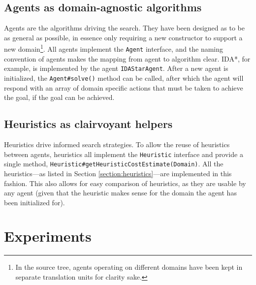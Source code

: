 \documentclass{article}
\begin{document}
\subsection{Agents as domain-agnostic algorithms}
Agents are the algorithms driving the search. They have been designed as to be as general as possible, in essence only requiring a new constructor to support a new domain\footnote{In the source tree, agents operating on different domains have been kept in separate translation units for clarity sake.}. All agents implement the \texttt{Agent} interface, and the naming convention of agents makes the mapping from agent to algorithm clear. IDA*, for example, is implemented by the agent \texttt{IDAStarAgent}. After a new agent is initialized, the \texttt{Agent\#solve()} method can be called, after which the agent will respond with an array of domain specific actions that must be taken to achieve the goal, if the goal can be achieved.

\subsection{Heuristics as clairvoyant helpers}
Heuristics drive informed search strategies. To allow the reuse of heuristics between agents, heuristics all implement the \texttt{Heuristic} interface and provide a single method, \texttt{Heuristic\#getHeuristicCostEstimate(Domain)}. All the heuristics---as listed in Section \ref{section:heuristics}---are implemented in this fashion. This also allows for easy comparison of heuristics, as they are usable by any agent (given that the heuristic makes sense for the domain the agent has been initialized for).

\section{Experiments}
\end{document}

